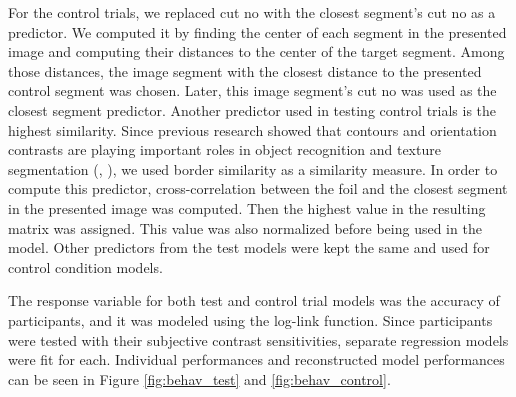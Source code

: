 \documentclass{article}
\begin{document}
For the control trials, we replaced cut no with the closest segment's cut no as a predictor. We computed it by finding the center of each segment in the presented image and computing their distances to the center of the target segment. Among those distances, the image segment with the closest distance to the presented control segment was chosen. Later, this image segment's cut no was used as the closest segment predictor. Another predictor used in testing control trials is the highest similarity. Since previous research showed that contours and orientation contrasts are playing important roles in object recognition and texture segmentation (\cite{peterson1994object}, \cite{nothdurft1991texture}), we used border similarity as a similarity measure. In order to compute this predictor, cross-correlation between the foil and the closest segment in the presented image was computed. Then the highest value in the resulting matrix was assigned. This value was also normalized before being used in the model. Other predictors from the test models were kept the same and used for control condition models.

The response variable for both test and control trial models was the accuracy of participants, and it was modeled using the log-link function. Since participants were tested with their subjective contrast sensitivities, separate regression models were fit for each. Individual performances and reconstructed model performances can be seen in Figure \ref{fig:behav_test} and \ref{fig:behav_control}.
\end{document}
